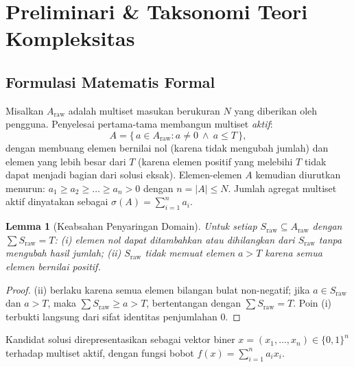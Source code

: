 \documentclass[journal,onecolumn,11pt]{IEEEtran}
\newtheorem{lemma}{Lemma}
\begin{document}
\section{Preliminari \& Taksonomi Teori Kompleksitas}
\label{sec:preliminaries}

\subsection{Formulasi Matematis Formal}
Misalkan $A_{\text{raw}}$ adalah multiset masukan berukuran $N$ yang diberikan oleh pengguna. Penyelesai pertama-tama membangun multiset \emph{aktif}:
\begin{equation}
    A = \{\, a \in A_{\text{raw}} : a \neq 0 \ \wedge\ a \le T \,\},
    \label{eq:active_set}
\end{equation}
dengan membuang elemen bernilai nol (karena tidak mengubah jumlah) dan elemen yang lebih besar dari $T$ (karena elemen positif yang melebihi $T$ tidak dapat menjadi bagian dari solusi eksak). Elemen-elemen $A$ kemudian diurutkan menurun: $a_1 \ge a_2 \ge \dots \ge a_n > 0$ dengan $n = |A| \le N$. Jumlah agregat multiset aktif dinyatakan sebagai $\sigma(A) = \sum_{i=1}^{n} a_i$.

\begin{lemma}[Keabsahan Penyaringan Domain]
\label{lem:filter}
Untuk setiap $S_{\text{raw}} \subseteq A_{\text{raw}}$ dengan $\sum S_{\text{raw}} = T$: (i) elemen nol dapat ditambahkan atau dihilangkan dari $S_{\text{raw}}$ tanpa mengubah hasil jumlah; (ii) $S_{\text{raw}}$ tidak memuat elemen $a > T$ karena semua elemen bernilai positif.
\end{lemma}
\begin{proof}
(ii) berlaku karena semua elemen bilangan bulat non-negatif; jika $a \in S_{\text{raw}}$ dan $a > T$, maka $\sum S_{\text{raw}} \ge a > T$, bertentangan dengan $\sum S_{\text{raw}} = T$. Poin (i) terbukti langsung dari sifat identitas penjumlahan $0$.
\end{proof}

Kandidat solusi direpresentasikan sebagai vektor biner $x = (x_1, \dots, x_n) \in \{0,1\}^n$ terhadap multiset aktif, dengan fungsi bobot $f(x) = \sum_{i=1}^n a_i x_i$.
\end{document}
